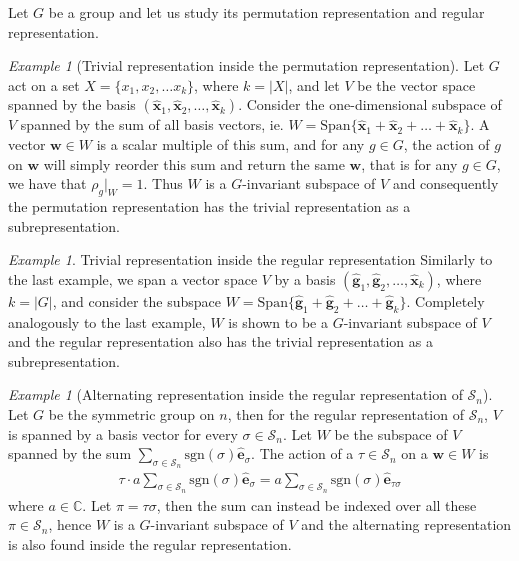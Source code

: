 \documentclass[12pt, a4paper, twoside]{article}
\theoremstyle{definition}
\theoremstyle{remark}
\newtheorem{example}[definition]{Example}
\numberwithin{equation}{section}
\newcommand{\CC}{\mathbb{C}}
\newcommand{\1}{\mathbf{1}}
\newcommand{\0}{\mathbf{0}}
\newcommand{\Sym}{\mathcal{S}} %
\newcommand{\sgn}{\text{sgn}}
\newcommand{\Span}{\text{Span}}
\newcommand{\bas}{\mathbf{\hat{e}}}
\newcommand{\ghat}{\mathbf{\hat{g}}}
\newcommand{\xhat}{\mathbf{\hat{x}}}
\newcommand{\wvec}{\mathbf{w}}
\begin{document}
	Let $G$ be a group and let us study its permutation representation and regular representation. 
	
	\begin{example}[Trivial representation inside the permutation representation]\cite[Example 1.4.3.]{Sagan}
		Let $G$ act on a set $X = \{x_1, x_2, \dots x_k\}$, where $k = |X|$, and let $V$ be the vector space spanned by the basis $(\xhat_1, \xhat_2, \dots, \xhat_k)$. Consider the one-dimensional subspace of $V$ spanned by the sum of all basis vectors, ie. $W = \Span\{ \xhat_1 + \xhat_2 + \dots + \xhat_k \}$. A vector $\wvec \in W$ is a scalar multiple of this sum, and for any $g \in G$, the action of $g$ on $\wvec$ will simply reorder this sum and return the same $\wvec$, that is for any $g \in G$, we have that $\rho_g|_W = 1$. Thus $W$ is a $G$-invariant subspace of $V$ and consequently the permutation representation has the trivial representation as a subrepresentation.
	\end{example}
	
	\begin{example}{Trivial representation inside the regular representation}\cite[Example 1.4.4.]{Sagan}
		Similarly to the last example, we span a vector space $V$ by a basis $(\ghat_1, \ghat_2, \dots, \xhat_{k})$, where $k = |G|$, and consider the subspace $W = \Span\{ \ghat_1 + \ghat_2 + \dots + \ghat_k \}$. Completely analogously to the last example, $W$ is shown to be a $G$-invariant subspace of $V$ and the regular representation also has the trivial representation as a subrepresentation.
	\end{example}
	
	\begin{example}[Alternating representation inside the regular representation of $\Sym_n$]\cite[Example 1.4.4.]{Sagan}
		Let $G$ be the symmetric group on $n$, then for the regular representation of $\Sym_n$, $V$ is spanned by a basis vector for every $\sigma \in \Sym_n$. Let $W$ be the subspace of $V$ spanned by the sum $\sum_{\sigma \in \Sym_n} \sgn(\sigma) \bas_{\sigma}$. The action of a $\tau \in \Sym_n$ on a $\wvec \in W$ is
		\begin{align*}
			\tau \cdot a\sum_{\sigma \in \Sym_n} \sgn(\sigma) \bas_{\sigma} = a \sum_{\sigma \in \Sym_n} \sgn(\sigma) \bas_{\tau\sigma} 
		\end{align*}
		where $a \in \CC$. Let $\pi = \tau\sigma$, then the sum can instead be indexed over all these $\pi \in \Sym_n$, hence $W$ is a $G$-invariant subspace of $V$ and the alternating representation is also found inside the regular representation.
	\end{example}
	
\end{document}
